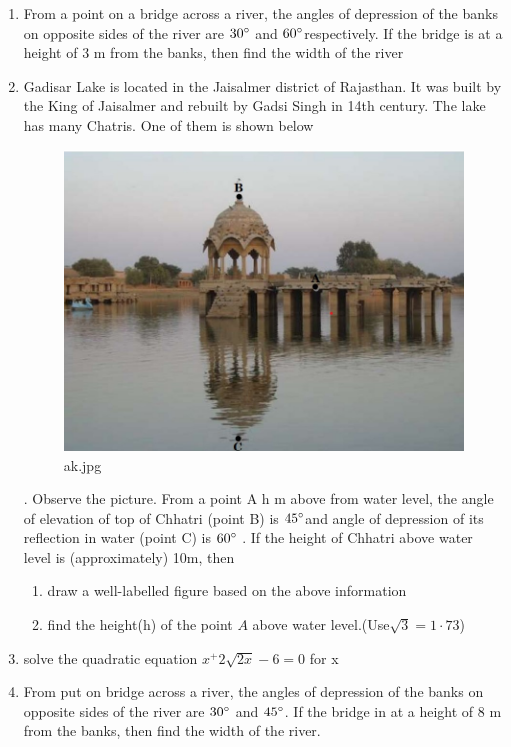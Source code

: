\documentclass{article}
\begin{document}
\begin{enumerate}
                 \item From a point on a bridge across a river, the angles of depression of the banks on opposite sides of the river are $30\degree$ and $60\degree$respectively. If the bridge is at a height of 3 m from the banks, then find the width of the river 
                 \item Gadisar Lake is located in the Jaisalmer district of Rajasthan. It was built by the King of Jaisalmer and rebuilt by Gadsi Singh in 14th century. The lake has many Chatris. One of them is shown below
\begin{figure}[htbp]
\centering
\includegraphics[width=\columnwidth]{figs/ak.jpg}
\caption{ak.jpg}
\end{figure}.
Observe the picture. From a point A h m above from water level, the 
angle of elevation of top of Chhatri (point B) is $45\degree$and angle of 
depression of its reflection in water (point C) is $60\degree$ . If the height of 
Chhatri above water level is (approximately) 10m, then 
\begin{enumerate}
\item draw a well-labelled figure based on the above information
\item find the height(h) of the point $A$ above water level.(Use$\sqrt{3}=1·73$) 
\end{enumerate}
       \item solve the quadratic equation 
       $x^+2\sqrt{2x}-6=0$ for x
       \item From put on bridge across a river, the angles of depression of the banks on opposite sides of the river are $30\degree$ and $45\degree$. If the bridge in at a height of 8 m from the banks, then find the width of the river.

\end{enumerate}
\end{document}
